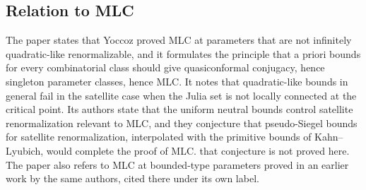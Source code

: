 \subsection*{Relation to MLC}

The paper states that Yoccoz proved MLC at parameters that are not infinitely quadratic-like
renormalizable, and it formulates the principle that a priori bounds for every combinatorial class
should give quasiconformal conjugacy, hence singleton parameter classes, hence MLC.  It notes that
quadratic-like bounds in general fail in the satellite case when the Julia set is not locally connected
at the critical point.  Its authors state that the uniform neutral bounds control satellite
renormalization relevant to MLC, and they conjecture that pseudo-Siegel bounds for satellite
renormalization, interpolated with the primitive bounds of Kahn--Lyubich, would complete the proof
of MLC.  that conjecture is not proved here.  The paper also refers to MLC at bounded-type parameters
proved in an earlier work by the same authors, cited there under its own label.